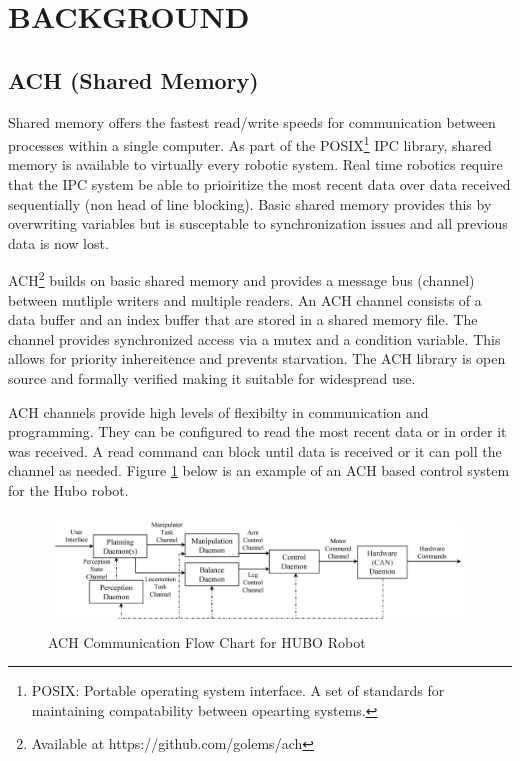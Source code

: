 \section{BACKGROUND}

\subsection{ACH (Shared Memory)}

Shared memory offers the fastest read/write speeds for communication between processes within a single computer. As part of the POSIX\footnote{POSIX: Portable operating system interface. A set of standards for maintaining compatability between opearting systems.} IPC library, shared memory is available to virtually every robotic system. Real time robotics require that the IPC system be able to prioiritize the most recent data over data received sequentially (non head of line blocking). Basic shared memory provides this by overwriting variables but is susceptable to synchronization issues and all previous data is now lost\cite{REALTIMEACH}. 

ACH\footnote{Available at https://github.com/golems/ach} builds on basic shared memory and provides a message bus (channel) between mutliple writers and multiple readers. An ACH channel consists of a data buffer and an index buffer that are stored in a shared memory file. The channel provides synchronized access via a mutex and a condition variable. This allows for priority inhereitence and prevents starvation\cite{REALTIMEACH}. The ACH library is open source and formally verified\cite{REALTIMEACH} making it suitable for widespread use.

ACH channels provide high levels of flexibilty in communication and programming. They can be configured to read the most recent data or in order it was received. A read command can block until data is received or it can poll the channel as needed. Figure \ref{fig:ach diagram} below is an example of an ACH based control system for the Hubo robot. 

\begin{figure}[thpb]
 \centering
 \includegraphics[width=1.0\columnwidth]{./images/achflow.png}
  \caption{ACH Communication Flow Chart for HUBO Robot}
  \label{fig:ach diagram}
\end{figure} 

